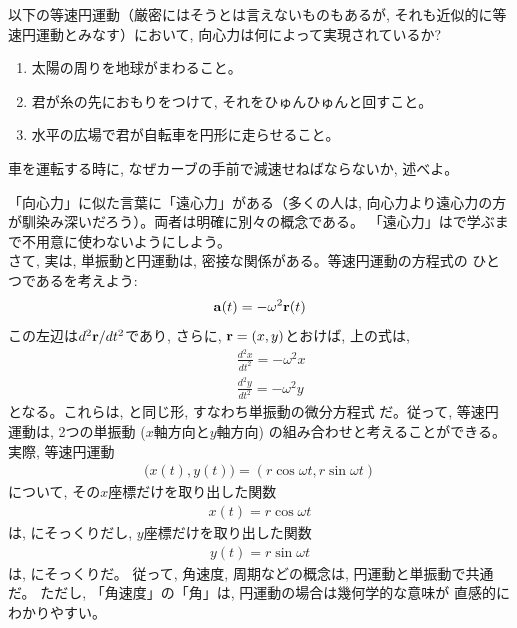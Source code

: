 \begin{q}\label{q:circular_motion} 以下の等速円運動（厳密にはそうとは言えないものもあるが, それも近似的に等速円運動とみなす）において, 向心力は何によって実現されているか?
\begin{enumerate}
\item 太陽の周りを地球がまわること。
\item 君が糸の先におもりをつけて, それをひゅんひゅんと回すこと。
\item 水平の広場で君が自転車を円形に走らせること。
\end{enumerate}
\end{q}

\begin{q}\label{q:car_slip}
車を運転する時に, なぜカーブの手前で減速せねばならないか, 述べよ。
\end{q}
\vspace{0.2cm}

「向心力」に似た言葉に「遠心力」がある（多くの人は, 向心力より遠心力の方が馴染み深いだろう）。両者は明確に別々の概念である。
「遠心力」はで学ぶまで不用意に使わないようにしよう。\\

さて, 実は, 単振動と円運動は, 密接な関係がある。等速円運動の方程式の
ひとつであるを考えよう:
\begin{eqnarray*}
{\bf a}(t)=-\omega^2{\bf r}(t)
\end{eqnarray*}
この左辺は$d^2{\bf r}/dt^2$であり, さらに, ${\bf r}=(x, y)$とおけば, 上の式は, 
\begin{eqnarray}
&&\frac{d^2 x}{dt^2}=-\omega^2 x\\
&&\frac{d^2 y}{dt^2}=-\omega^2 y
\end{eqnarray}
となる。これらは, と同じ形, すなわち単振動の微分方程式
だ。従って, 等速円運動は, 2つの単振動 ($x$軸方向と$y$軸方向)
の組み合わせと考えることができる。実際, 等速円運動
\begin{eqnarray}\bigl(x(t), y(t)\bigr)=(r\cos\omega t, r\sin\omega t)\end{eqnarray}
について, その$x$座標だけを取り出した関数
\begin{eqnarray}x(t)=r\cos\omega t\end{eqnarray}
は, にそっくりだし, $y$座標だけを取り出した関数
\begin{eqnarray}y(t)=r\sin\omega t\end{eqnarray}
は, にそっくりだ。
従って, 角速度, 周期などの概念は, 円運動と単振動で共通だ。
ただし, 「角速度」の「角」は, 円運動の場合は幾何学的な意味が
直感的にわかりやすい。
\vspace{0.2cm}

